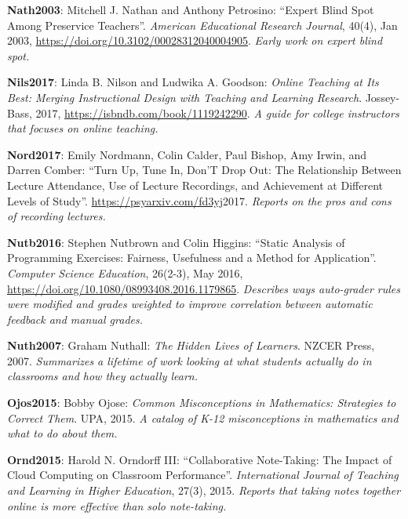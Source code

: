 \textbf{\hypertarget{b:Nath2003}{Nath2003}\label{b:Nath2003}}: Mitchell J. Nathan and Anthony Petrosino: ``Expert Blind Spot Among Preservice Teachers''. \emph{American Educational Research Journal}, 40(4), Jan 2003, \url{https://doi.org/10.3102/00028312040004905}. \emph{Early work on expert blind spot.}

\textbf{\hypertarget{b:Nils2017}{Nils2017}\label{b:Nils2017}}: Linda B. Nilson and Ludwika A. Goodson: \emph{Online Teaching at Its Best: Merging Instructional Design with Teaching and Learning Research}. Jossey-Bass, 2017, \url{https://isbndb.com/book/1119242290}. \emph{A guide for college instructors that focuses on online teaching.}

\textbf{\hypertarget{b:Nord2017}{Nord2017}\label{b:Nord2017}}: Emily Nordmann, Colin Calder, Paul Bishop, Amy Irwin, and Darren Comber: ``Turn Up, Tune In, Don'T Drop Out: The Relationship Between Lecture Attendance, Use of Lecture Recordings, and Achievement at Different Levels of Study''. \url{https://psyarxiv.com/fd3yj}2017. \emph{Reports on the pros and cons of recording lectures.}

\textbf{\hypertarget{b:Nutb2016}{Nutb2016}\label{b:Nutb2016}}: Stephen Nutbrown and Colin Higgins: ``Static Analysis of Programming Exercises: Fairness, Usefulness and a Method for Application''. \emph{Computer Science Education}, 26(2-3), May 2016, \url{https://doi.org/10.1080/08993408.2016.1179865}. \emph{Describes ways auto-grader rules were modified and grades weighted to improve correlation between automatic feedback and manual grades.}

\textbf{\hypertarget{b:Nuth2007}{Nuth2007}\label{b:Nuth2007}}: Graham Nuthall: \emph{The Hidden Lives of Learners}. NZCER Press, 2007. \emph{Summarizes a lifetime of work looking at what students actually do in classrooms and how they actually learn.}

\textbf{\hypertarget{b:Ojos2015}{Ojos2015}\label{b:Ojos2015}}: Bobby Ojose: \emph{Common Misconceptions in Mathematics: Strategies to Correct Them}. UPA, 2015. \emph{A catalog of K-12 misconceptions in mathematics and what to do about them.}

\textbf{\hypertarget{b:Ornd2015}{Ornd2015}\label{b:Ornd2015}}: Harold N. Orndorff III: ``Collaborative Note-Taking: The Impact of Cloud Computing on Classroom Performance''. \emph{International Journal of Teaching and Learning in Higher Education}, 27(3), 2015. \emph{Reports that taking notes together online is more effective than solo note-taking.}

